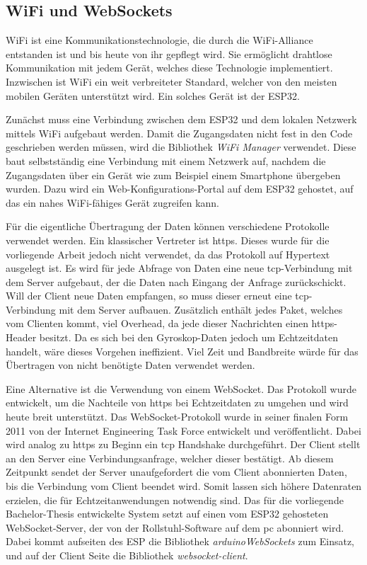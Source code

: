 \subsection{WiFi und WebSockets}
WiFi ist eine Kommunikationstechnologie, die durch die WiFi-Alliance entstanden ist und bis heute von ihr gepflegt wird\cite{WhoWeAre}.
Sie ermöglicht drahtlose Kommunikation mit jedem Gerät, welches diese Technologie implementiert.
Inzwischen ist WiFi ein weit verbreiteter Standard, welcher von den meisten mobilen Geräten unterstützt wird\cite{DiscoverWiFiWiFi}.
Ein solches Gerät ist der ESP32.

Zunächst muss eine Verbindung zwischen dem ESP32 und dem lokalen Netzwerk mittels WiFi aufgebaut werden.
Damit die Zugangsdaten nicht fest in den Code geschrieben werden müssen, wird die Bibliothek \textit{WiFi Manager}\cite{tzapuWiFiManager2022} verwendet.
Diese baut selbstständig eine Verbindung mit einem Netzwerk auf, nachdem die Zugangsdaten über ein Gerät wie zum Beispiel einem Smartphone übergeben wurden.
Dazu wird ein Web-Konfigurations-Portal auf dem ESP32 gehostet, auf das ein nahes WiFi-fähiges Gerät zugreifen kann.

Für die eigentliche Übertragung der Daten können verschiedene Protokolle verwendet werden.
Ein klassischer Vertreter ist \ac{https}.
Dieses wurde für die vorliegende Arbeit jedoch nicht verwendet, da das Protokoll auf Hypertext ausgelegt ist.
Es wird für jede Abfrage von Daten eine neue \ac{tcp}-Verbindung mit dem Server aufgebaut, der die Daten nach Eingang der Anfrage zurückschickt.
Will der Client neue Daten empfangen, so muss dieser erneut eine \ac{tcp}-Verbindung mit dem Server aufbauen\cite{ietfRFC6455WebSocket}.
Zusätzlich enthält jedes Paket, welches vom Clienten kommt, viel Overhead, da jede dieser Nachrichten einen \ac{https}-Header besitzt\cite{ietfRFC6455WebSocket}.
Da es sich bei den Gyroskop-Daten jedoch um Echtzeitdaten handelt, wäre dieses Vorgehen ineffizient.
Viel Zeit und Bandbreite würde für das Übertragen von nicht benötigte Daten verwendet werden.

Eine Alternative ist die Verwendung von einem WebSocket.
Das Protokoll wurde entwickelt, um die Nachteile von \ac{https} bei Echtzeitdaten zu umgehen und wird heute breit unterstützt.
Das WebSocket-Protokoll wurde in seiner finalen Form 2011 von der Internet Engineering Task Force entwickelt und veröffentlicht\cite{ietfRFC6455WebSocket}.
Dabei wird analog zu \ac{https} zu Beginn ein \ac{tcp} Handshake durchgeführt. Der Client stellt an den Server eine Verbindungsanfrage, welcher dieser bestätigt.
Ab diesem Zeitpunkt sendet der Server unaufgefordert die vom Client abonnierten Daten, bis die Verbindung vom Client beendet wird\cite{ietfRFC6455WebSocket}.
Somit lassen sich höhere Datenraten erzielen, die für Echtzeitanwendungen notwendig sind.
Das für die vorliegende Bachelor-Thesis entwickelte System setzt auf einen vom ESP32 gehosteten WebSocket-Server, der von der Rollstuhl-Software auf dem \ac{pc} abonniert wird.
Dabei kommt aufseiten des ESP die Bibliothek \textit{arduinoWebSockets}\cite{markusWebSocketServerClient2022} zum Einsatz, und auf der Client Seite die Bibliothek \textit{websocket-client}\cite{kotasWebsocketclient2022}.

